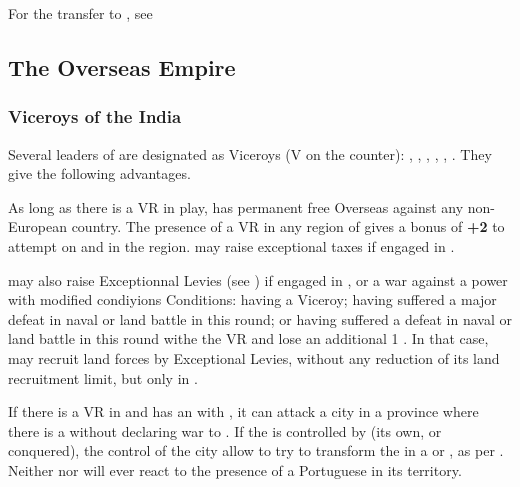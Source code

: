 \aparag For the transfer to , see

\subsection{The Overseas Empire}
\subsubsection{Viceroys of the India}\label{chSpecific:Portugal:Viceroys}
\aparag Several leaders of \POR are designated as Viceroys (V on the
counter): , , ,
, , \leaderNoronha. They give \POR
the following advantages.

\bparag As long as there is a VR in play, \POR has permanent free
Overseas \CB against any non-European country.
\bparag The presence of a VR in any region of \ROTW gives a bonus of
{\bf +2} to \CONC attempt on \TP and \COL in the region.
\aparag \POR may raise exceptional taxes if engaged in .

\aparag \POR may also raise Exceptionnal Levies (see
) if engaged in , or a war against a \ROTW power with modified condiyions
\bparag Conditions: having a Viceroy; having suffered a major defeat in
naval or land battle in \ROTW this round; or having suffered a defeat in
naval or land battle in \ROTW this round withe the VR and lose an
additional 1 \STAB.
\bparag In that case, \POR may recruit land forces by Exceptional
Levies, without any reduction of its land recruitment limit, but only in
\ROTW.

\label{chSpecific:Portugal:Goa Colony}
\bparag If there is a VR in  and \POR has an \dipAT
with , it can attack a city in a province where there
is a \TP without declaring war to .
\bparag If the \TP is controlled by \POR (its own, or conquered), the
control of the city allow \POR to try to transform the \TP in a \COL or
\POR, as per .
\bparag Neither  nor  will ever react to
the presence of a Portuguese \COL in its territory.

